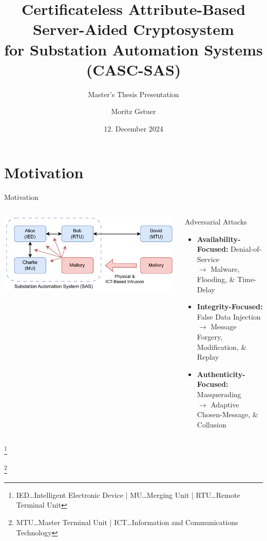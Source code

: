 \documentclass[en]{sdqbeamer}
\title[ABAC for Substations]{Certificateless Attribute-Based Server-Aided Cryptosystem\\for Substation Automation Systems (CASC-SAS)}
\subtitle{Master's Thesis Presentation}
\author[Moritz Gstuer]{Moritz Gstuer}
\date[12.\,12.\,2024]{12. December 2024}
\newcommand\nonumberfootnote[1]{%
  \begingroup
  \renewcommand\thefootnote{}\footnote{#1}%
  \addtocounter{footnote}{-1}%
  \endgroup
}
\begin{document}
 
\KITtitleframe


\section{Motivation}
\begin{frame}{Motivation}
    \begin{columns}
        \centering
        \includegraphics[width=1.0\textwidth]{./figures/sas_intrusion.drawio.pdf}
        \begin{redblock}{Adversarial Attacks}
            \begin{itemize}
                \item \textbf{Availability-Focused:} Denial-of-Service\\$\rightarrow$ Malware, Flooding, \& Time-Delay
                \item \textbf{Integrity-Focused:} False Data Injection\\$\rightarrow$ Message Forgery, Modification, \& Replay
                \item \textbf{Authenticity-Focused:} Masquerading\\$\rightarrow$ Adaptive Chosen-Message, \& Collusion
            \end{itemize}
        \end{redblock}
    \end{columns}
    \nonumberfootnote{IED\dots Intelligent Electronic Device | MU\dots Merging Unit | RTU\dots Remote Terminal Unit}
    \nonumberfootnote{MTU\dots Master Terminal Unit | ICT\dots Information and Communications Technology}
\end{frame}
\end{document}
